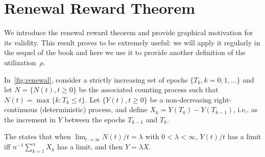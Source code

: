

\section{Renewal Reward Theorem}
\label{sec:renew-reward-theor}


We introduce  the renewal reward theorem and provide graphical motivation for its validity.
This result proves to be extremely useful: we will apply it regularly in the sequel of the book and here we use it to provide another definition of the utilization~$\rho$.


In~\cref{fig:renewal},  consider a strictly increasing set of epochs $\{T_k, k=0, 1, \ldots\}$ and
let $N=\{N(t), t\geq 0\}$ be the associated counting process such that  $N(t) = \max\{k : T_k \leq t\}$.
Let $\{Y(t), t\geq 0\}$ be a non-decreasing right-continuous (deterministic) process, and define $X_k = Y(T_k)-Y(T_{k-1})$, i.e,.
as the increment
in $Y$ between the epochs $T_{k-1}$ and $T_k$.

The  states that when $\lim_{t\to\infty} N(t)/t = \lambda$ with $0<\lambda < \infty$, $Y(t)/t$ has a limit iff $n^{-1}\sum_{k=1}^n X_k$ has a limit, and then $Y=\lambda X$.



